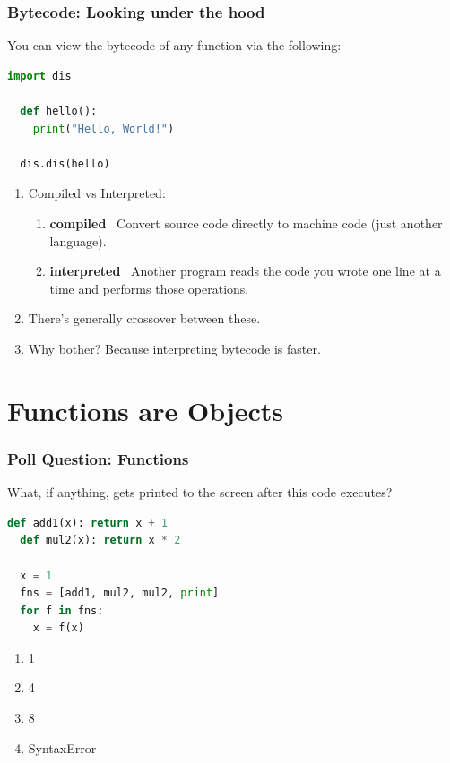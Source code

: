 \documentclass{beamer}
\begin{document}
%
%
\begin{frame}[fragile]
  \frametitle{Bytecode: Looking under the hood}
  You can view the bytecode of any function via the following:
  \begin{lstlisting}[language=Python, autogobble]
  import dis

  def hello():
    print("Hello, World!")

  dis.dis(hello)
  \end{lstlisting}
  \vfill
  \begin{enumerate}[A]
    \item Compiled vs Interpreted:
      \begin{enumerate}
        \item \textbf{compiled} \textrightarrow \ Convert source code directly to machine code (just another language).
        \item \textbf{interpreted} \textrightarrow \ Another program reads the code you wrote one line at a time and performs those operations.
      \end{enumerate}
    \item There's generally crossover between these.
    \item Why bother? Because interpreting bytecode is faster.
  \end{enumerate}
\end{frame}

\section{Functions are Objects}

%
%
\begin{frame}[fragile]
  \frametitle{Poll Question: Functions}
  What, if anything, gets printed to the screen after this code executes?
  \begin{lstlisting}[language=Python, autogobble]
  def add1(x): return x + 1
  def mul2(x): return x * 2

  x = 1
  fns = [add1, mul2, mul2, print]
  for f in fns:
    x = f(x)
  \end{lstlisting}
  \vfill
  \begin{enumerate}[A]
    \item 1
    \item 4
    \item 8
    \item SyntaxError
  \end{enumerate}
\end{frame}
\end{document}

